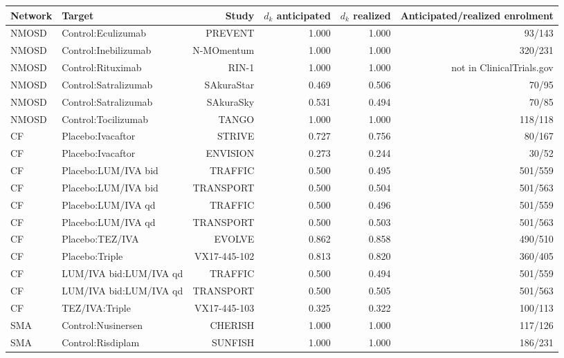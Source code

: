 \begin{tabular}{llrrrr}
\toprule
Network & Target & Study & $d_k$ anticipated & $d_k$ realized & Anticipated/realized enrolment \\
\midrule
NMOSD & Control:Eculizumab & PREVENT & 1.000 & 1.000 & 93/143 \\
NMOSD & Control:Inebilizumab & N-MOmentum & 1.000 & 1.000 & 320/231 \\
NMOSD & Control:Rituximab & RIN-1 & 1.000 & 1.000 & not in ClinicalTrials.gov \\
NMOSD & Control:Satralizumab & SAkuraStar & 0.469 & 0.506 & 70/95 \\
NMOSD & Control:Satralizumab & SAkuraSky & 0.531 & 0.494 & 70/85 \\
NMOSD & Control:Tocilizumab & TANGO & 1.000 & 1.000 & 118/118 \\
CF & Placebo:Ivacaftor & STRIVE & 0.727 & 0.756 & 80/167 \\
CF & Placebo:Ivacaftor & ENVISION & 0.273 & 0.244 & 30/52 \\
CF & Placebo:LUM/IVA bid & TRAFFIC & 0.500 & 0.495 & 501/559 \\
CF & Placebo:LUM/IVA bid & TRANSPORT & 0.500 & 0.504 & 501/563 \\
CF & Placebo:LUM/IVA qd & TRAFFIC & 0.500 & 0.496 & 501/559 \\
CF & Placebo:LUM/IVA qd & TRANSPORT & 0.500 & 0.503 & 501/563 \\
CF & Placebo:TEZ/IVA & EVOLVE & 0.862 & 0.858 & 490/510 \\
CF & Placebo:Triple & VX17-445-102 & 0.813 & 0.820 & 360/405 \\
CF & LUM/IVA bid:LUM/IVA qd & TRAFFIC & 0.500 & 0.494 & 501/559 \\
CF & LUM/IVA bid:LUM/IVA qd & TRANSPORT & 0.500 & 0.505 & 501/563 \\
CF & TEZ/IVA:Triple & VX17-445-103 & 0.325 & 0.322 & 100/113 \\
SMA & Control:Nusinersen & CHERISH & 1.000 & 1.000 & 117/126 \\
SMA & Control:Risdiplam & SUNFISH & 1.000 & 1.000 & 186/231 \\
\bottomrule
\end{tabular}
